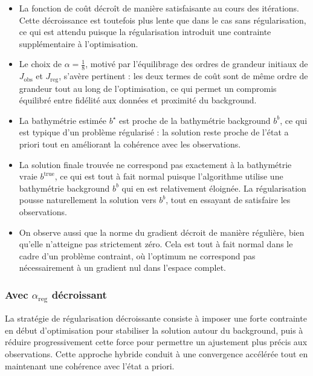 \documentclass{article}
\begin{document}
\begin{itemize}
    \item La fonction de coût décroît de manière satisfaisante au cours des itérations. Cette décroissance est toutefois plus lente que dans le cas sans régularisation, ce qui est attendu puisque la régularisation introduit une contrainte supplémentaire à l’optimisation.
    
    \item Le choix de \(\alpha = \tfrac{1}{8}\), motivé par l'équilibrage des ordres de grandeur initiaux de \(J_{\text{obs}}\) et \(J_{\text{reg}}\), s'avère pertinent : les deux termes de coût sont de même ordre de grandeur tout au long de l’optimisation, ce qui permet un compromis équilibré entre fidélité aux données et proximité du background.
    
    \item La bathymétrie estimée \(b^\star\) est proche de la bathymétrie background \(b^b\), ce qui est typique d’un problème régularisé : la solution reste proche de l’état a priori tout en améliorant la cohérence avec les observations.
    
    \item La solution finale trouvée ne correspond pas exactement à la bathymétrie vraie \(b^{\text{true}}\), ce qui est tout à fait normal puisque l’algorithme utilise une bathymétrie background \(b^b\) qui en est relativement éloignée. La régularisation pousse naturellement la solution vers \(b^b\), tout en essayant de satisfaire les observations.
    
    
    \item On observe aussi que la norme du gradient décroit de manière régulière, bien qu’elle n’atteigne pas strictement zéro. Cela est tout à fait normal dans le cadre d’un problème contraint, où l’optimum ne correspond pas nécessairement à un gradient nul dans l’espace complet.
\end{itemize}


\subsubsection{Avec \(\alpha_{\text{reg}}\) décroissant}

La stratégie de régularisation décroissante consiste à imposer une forte contrainte en début d'optimisation pour stabiliser la solution autour du background, puis à réduire progressivement cette force pour permettre un ajustement plus précis aux observations. Cette approche hybride conduit à une convergence accélérée tout en maintenant une cohérence avec l’état a priori.
\end{document}
